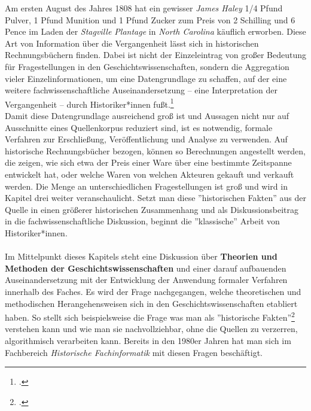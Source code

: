\documentclass[12pt,a4paper]{article}
\begin{document}
Am ersten August des Jahres 1808 hat ein gewisser \textit{James Haley} 1/4 Pfund Pulver, 1 Pfund Munition und 1 Pfund Zucker zum Preis von 2 Schilling und 6 Pence im Laden der \textit{Stagville Plantage} in \textit{North Carolina} käuflich erworben. Diese Art von Information über die Vergangenheit lässt sich in historischen Rechnungsbüchern finden. Dabei ist nicht der Einzeleintrag von großer Bedeutung für Fragestellungen in den Geschichtswissenschaften, sondern die Aggregation vieler Einzelinformationen, um eine Datengrundlage zu schaffen, auf der eine weitere fachwissenschaftliche Auseinandersetzung -- eine Interpretation der Vergangenheit -- durch Historiker*innen fußt.\footcite[][06.06.2019]{vogeler2015mittelalterliche}
\\
Damit diese Datengrundlage ausreichend groß ist und Aussagen nicht nur auf Ausschnitte eines Quellenkorpus reduziert sind, ist es notwendig, formale Verfahren zur Erschließung, Veröffentlichung und Analyse zu verwenden. Auf historische Rechnungsbücher bezogen, können so Berechnungen angestellt werden, die zeigen, wie sich etwa der Preis einer Ware über eine bestimmte Zeitspanne entwickelt hat, oder welche Waren von welchen Akteuren gekauft und verkauft werden. Die Menge an unterschiedlichen Fragestellungen ist groß und wird in Kapitel drei weiter veranschaulicht. Setzt man diese ''historischen Fakten'' aus der Quelle in einen größerer historischen Zusammenhang und als Diskussionsbeitrag in die fachwissenschaftliche Diskussion, beginnt die ''klassische'' Arbeit von Historiker*innen. 
\\
\\
Im Mittelpunkt dieses Kapitels steht eine Diskussion über \textbf{Theorien und Methoden der Geschichtswissenschaften} und einer darauf aufbauenden Auseinandersetzung mit der Entwicklung der Anwendung formaler Verfahren innerhalb des Faches. Es wird der Frage nachgegangen, welche theoretischen und methodischen Herangehensweisen sich in den Geschichtswissenschaften etabliert haben. So stellt sich beispielsweise die Frage was man als ''historische Fakten''\footcite[BECKER untersucht was als \textit{historische Fakten} verstanden werden kann bzw. wo und wann von diesen gesprochen wird:][]{becker1955historical} verstehen kann und wie man sie nachvollziehbar, ohne die Quellen zu verzerren, algorithmisch verarbeiten kann. Bereits in den 1980er Jahren hat man sich im Fachbereich \textit{Historische Fachinformatik} mit diesen Fragen beschäftigt.
\\
\end{document}
